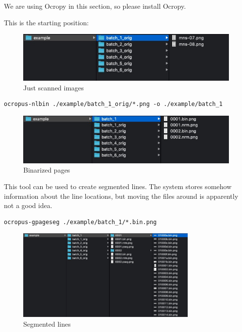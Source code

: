 \documentclass[]{book}
\begin{document}
We are using Ocropy in this section, so please install Ocropy.

This is the starting position:

\begin{figure}
\centering
\includegraphics{./images/ocropy_starting_point.jpg}
\caption{Just scanned images}
\end{figure}

\begin{verbatim}
ocropus-nlbin ./example/batch_1_orig/*.png -o ./example/batch_1
\end{verbatim}

\begin{figure}
\centering
\includegraphics{./images/ocropy_binarized_pages.jpg}
\caption{Binarized pages}
\end{figure}

This tool can be used to create segmented lines. The system stores somehow information about the line locations, but moving the files around is apparently not a good idea.

\begin{verbatim}
ocropus-gpageseg ./example/batch_1/*.bin.png
\end{verbatim}

\begin{figure}
\centering
\includegraphics[width=0.8\textwidth,height=\textheight]{./images/ocropy_segmented_lines.jpg}
\caption{Segmented lines}
\end{figure}
\end{document}
